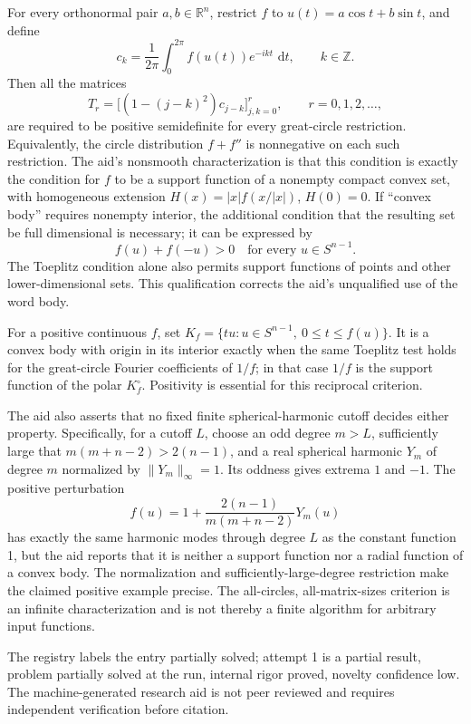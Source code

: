 \documentclass[11pt]{article}
\newcommand{\Z}{\mathbb{Z}}
\newcommand{\R}{\mathbb{R}}
\newcommand{\dd}{\,\mathrm{d}}
\begin{document}
For every orthonormal pair \(a,b\in\R^n\), restrict \(f\) to \(u(t)=a\cos t+b\sin t\), and define
\[
c_k=\frac1{2\pi}\int_0^{2\pi}f(u(t))e^{-ikt}\,\dd t,\qquad k\in\Z.
\]
Then all the matrices
\[
T_r=\bigl[(1-(j-k)^2)c_{j-k}\bigr]_{j,k=0}^r,\qquad r=0,1,2,\ldots,
\]
are required to be positive semidefinite for every great-circle restriction. Equivalently, the circle distribution \(f+f''\) is nonnegative on each such restriction. The aid's nonsmooth characterization is that this condition is exactly the condition for \(f\) to be a support function of a nonempty compact convex set, with homogeneous extension \(H(x)=|x|f(x/|x|)\), \(H(0)=0\). If ``convex body'' requires nonempty interior, the additional condition that the resulting set be full dimensional is necessary; it can be expressed by
\[
f(u)+f(-u)>0\quad\text{for every }u\in S^{n-1}.
\]
The Toeplitz condition alone also permits support functions of points and other lower-dimensional sets. This qualification corrects the aid's unqualified use of the word body.

For a positive continuous \(f\), set \(K_f=\{tu:u\in S^{n-1},\ 0\le t\le f(u)\}\). It is a convex body with origin in its interior exactly when the same Toeplitz test holds for the great-circle Fourier coefficients of \(1/f\); in that case \(1/f\) is the support function of the polar \(K_f^\circ\). Positivity is essential for this reciprocal criterion.

The aid also asserts that no fixed finite spherical-harmonic cutoff decides either property. Specifically, for a cutoff \(L\), choose an odd degree \(m>L\), sufficiently large that \(m(m+n-2)>2(n-1)\), and a real spherical harmonic \(Y_m\) of degree \(m\) normalized by \(\|Y_m\|_\infty=1\). Its oddness gives extrema \(1\) and \(-1\). The positive perturbation
\[
f(u)=1+\frac{2(n-1)}{m(m+n-2)}Y_m(u)
\]
has exactly the same harmonic modes through degree \(L\) as the constant function 1, but the aid reports that it is neither a support function nor a radial function of a convex body. The normalization and sufficiently-large-degree restriction make the claimed positive example precise. The all-circles, all-matrix-sizes criterion is an infinite characterization and is not thereby a finite algorithm for arbitrary input functions.

The registry labels the entry partially solved; attempt 1 is a partial result, problem partially solved at the run, internal rigor proved, novelty confidence low. The machine-generated research aid is not peer reviewed and requires independent verification before citation.
\end{document}
